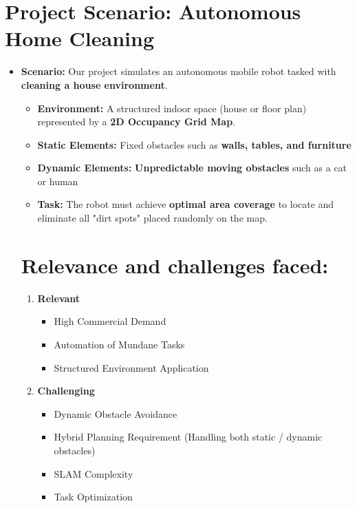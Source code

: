 \documentclass[12pt,a4paper]{report}
\begin{document}
 \section*{Project Scenario: Autonomous Home Cleaning}

\begin{itemize}
    \item \textbf{Scenario:} Our project simulates an autonomous mobile robot tasked with \textbf{cleaning a house environment}.
    \begin{itemize}
        \item \textbf{Environment:} A structured indoor space (house or floor plan) represented by a \textbf{2D Occupancy Grid Map}.
        \item \textbf{Static Elements:} Fixed obstacles such as \textbf{walls, tables, and furniture} 
        \item \textbf{Dynamic Elements:} \textbf{Unpredictable moving obstacles} such as a cat or human 
        \item \textbf{Task:} The robot must achieve \textbf{optimal area coverage} to locate and eliminate all "dirt spots" placed randomly on the map.
    \end{itemize}
\begin{itemize}
\section*{Relevance and challenges faced:}
    \begin{enumerate}
        \item \textbf{Relevant}
        \begin{itemize}
            \item [$\checkmark$] High Commercial Demand
            \item [$\checkmark$] Automation of Mundane Tasks
            \item [$\checkmark$] Structured Environment Application
        \end{itemize}
   
    \item \textbf{Challenging}
    \begin{itemize}
        \item [$\checkmark$] Dynamic Obstacle Avoidance
        \item [$\checkmark$] Hybrid Planning Requirement (Handling both static / dynamic obstacles)
        \item [$\checkmark$] SLAM Complexity
        \item [$\checkmark$] Task Optimization
    \end{itemize}
\end{enumerate}
\end{itemize}



\end{itemize}
\end{document}
